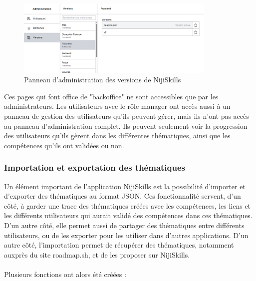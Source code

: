 \documentclass[12pt]{article}
\begin{document}
\begin{figure}[H]
    \centering
    \includegraphics[width=0.85\textwidth]{img/admin-version.png}
    \caption{Panneau d'administration des versions de NijiSkills}
\end{figure}
Ces pages qui font office de "backoffice" ne sont accessibles que par les administrateurs. Les utilisateurs avec le rôle manager ont accès aussi à un panneau de gestion des utilisateurs qu'ils peuvent gérer, mais ils n'ont pas accès au panneau d'administration complet. Ils peuvent seulement voir la progression des utilisateurs qu'ils gèrent dans les différentes thématiques, ainsi que les compétences qu'ils ont validées ou non.

\subsubsection{Importation et exportation des thématiques}
Un élément important de l'application NijiSkills est la possibilité d'importer et d'exporter des thématiques au format JSON. Ces fonctionnalité servent, d'un côté, à garder une trace des thématiques créées avec les compétences, les liens et les différents utilisateurs qui aurait validé des compétences dans ces thématiques. D'un autre côté, elle permet aussi de partager des thématiques entre différents utilisateurs, ou de les exporter pour les utiliser dans d'autres applications. D'un autre côté, l'importation permet de récupérer des thématiques, notamment auxprès du site roadmap.sh, et de les proposer sur NijiSkills.
\\\\
Plusieurs fonctions ont alors été créées :
\end{document}
